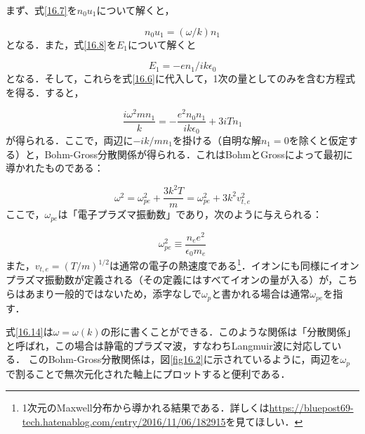 \documentclass{ltjsarticle}
\numberwithin{equation}{section} %
\begin{document}
まず、式\eqref{16.7}を$n_0u_1$について解くと，

\begin{equation}
  n_0u_1 = (\omega/k)n_1 \label{16.11}
\end{equation}
となる．また，式\eqref{16.8}を$E_1$について解くと

\begin{equation}
  E_1 = -en_1/ik\epsilon_0 \label{16.12}
\end{equation}
となる．そして，これらを式\eqref{16.6}に代入して，1次の量としてのみを含む方程式を得る．すると，

\begin{equation}
  \frac{i\omega^2mn_1}{k} = -\frac{e^2n_0n_1}{ik\epsilon_0} + 3iTn_1 \label{16.13}
\end{equation}
が得られる．ここで，両辺に$-ik/mn_1$を掛ける（自明な解$n_1=0$を除くと仮定する）と，Bohm-Gross分散関係が得られる．これはBohmとGrossによって最初に導かれたものである：

\begin{equation}
  \omega^2 = \omega^2_{pe} + \frac{3k^2T}{m} = \omega^2_{pe} + 3k^2v^2_{t,e} \label{16.14}
\end{equation}
ここで，$\omega_{pe}$は「電子プラズマ振動数」であり，次のように与えられる：

\begin{equation}
  \omega^2_{pe} \equiv \frac{n_ee^2}{\epsilon_0m_e} \label{16.15}
\end{equation}
また，$v_{t,e}=(T/m)^{1/2}$は通常の電子の熱速度である\footnote{1次元のMaxwell分布から導かれる結果である．詳しくは\url{https://bluepost69-tech.hatenablog.com/entry/2016/11/06/182915}を見てほしい．}．イオンにも同様にイオンプラズマ振動数が定義される（その定義にはすべてイオンの量が入る）が，こちらはあまり一般的ではないため，添字なしで$\omega_p$と書かれる場合は通常$\omega_{pe}$を指す．

式\eqref{16.14}は$\omega=\omega(k)$の形に書くことができる．このような関係は「分散関係」と呼ばれ，この場合は静電的プラズマ波，すなわちLangmuir波に対応している．
このBohm-Gross分散関係は，図\ref{fig16.2}に示されているように，両辺を$\omega_p$で割ることで無次元化された軸上にプロットすると便利である．
\end{document}
